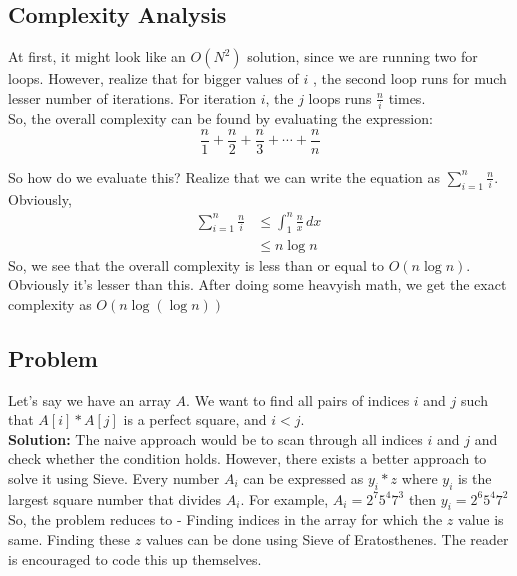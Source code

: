 \subsection{Complexity Analysis}
At first, it might look like an $O(N^2)$ solution, since we are running two for loops. However, realize that for bigger values of $i$ , the second loop runs for much lesser number of iterations. For iteration $i$, the $j$ loops runs $\frac{n}{i}$ times.\\
So, the overall complexity can be found by evaluating the expression:\\
\begin{equation*}
    \frac{n}{1} + \frac{n}{2} + \frac{n}{3} + \cdots + \frac{n}{n}
\end{equation*}

So how do we evaluate this? Realize that we can write the equation as $\sum_{i=1}^{n} \frac{n}{i} $. Obviously,
\begin{align*}
    \sum_{i=1}^{n} \frac{n}{i} &\le \int_{1}^{n} \frac{n}{x} \,dx\ \\
    & \le n \log n
\end{align*}
So, we see that the overall complexity is less than or equal to $O(n \log n)$. Obviously it's lesser than this. After doing some heavyish math, we get the exact complexity as $O(n \log (\log n))$ \clearpage

\subsection{Problem}
Let's say we have an array $A$. We want to find all pairs of indices $i$ and $j$ such that $A[i]*A[j]$ is a perfect square, and $i < j$.\\
\textbf{Solution:} The naive approach would be to scan through all indices $i$ and $j$ and check whether the condition holds. However, there exists a better approach to solve it using Sieve. Every number $A_i$ can be expressed as $y_i*z$ where $y_i$ is the largest square number that divides $A_i$. For example, $A_i = 2^7 5^4 7^3$ then $y_i = 2^6 5^4 7^2$ \\
So, the problem reduces to - Finding indices in the array for which the $z$ value is same. Finding these $z$ values can be done using Sieve of Eratosthenes. The reader is encouraged to code this up themselves.

